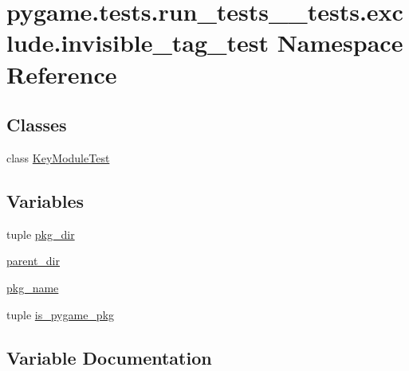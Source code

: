 \hypertarget{namespacepygame_1_1tests_1_1run__tests____tests_1_1exclude_1_1invisible__tag__test}{}\section{pygame.\+tests.\+run\+\_\+tests\+\_\+\+\_\+tests.\+exclude.\+invisible\+\_\+tag\+\_\+test Namespace Reference}
\label{namespacepygame_1_1tests_1_1run__tests____tests_1_1exclude_1_1invisible__tag__test}
\subsection*{Classes}
\begin{DoxyCompactItemize}
\item 
class \hyperlink{classpygame_1_1tests_1_1run__tests____tests_1_1exclude_1_1invisible__tag__test_1_1_key_module_test}{Key\+Module\+Test}
\end{DoxyCompactItemize}
\subsection*{Variables}
\begin{DoxyCompactItemize}
\item 
tuple \hyperlink{namespacepygame_1_1tests_1_1run__tests____tests_1_1exclude_1_1invisible__tag__test_aec6fc1bf908ef539d315fbd166ef4b89}{pkg\+\_\+dir}
\item 
\hyperlink{namespacepygame_1_1tests_1_1run__tests____tests_1_1exclude_1_1invisible__tag__test_aaabfdf7dec7e05880d1453a4594abb0d}{parent\+\_\+dir}
\item 
\hyperlink{namespacepygame_1_1tests_1_1run__tests____tests_1_1exclude_1_1invisible__tag__test_a7bfbcad3ff3e3771e018f9423a5bfa87}{pkg\+\_\+name}
\item 
tuple \hyperlink{namespacepygame_1_1tests_1_1run__tests____tests_1_1exclude_1_1invisible__tag__test_a851561ad3438094499d116ceb9a45238}{is\+\_\+pygame\+\_\+pkg}
\end{DoxyCompactItemize}


\subsection{Variable Documentation}
\mbox{\label{namespacepygame_1_1tests_1_1run__tests____tests_1_1exclude_1_1invisible__tag__test_a851561ad3438094499d116ceb9a45238}} 
